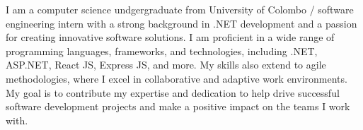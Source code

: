 

\begin{cvparagraph}

    I am a computer science undgergraduate from University of Colombo /  software engineering intern with a strong background in .NET development and a passion for creating innovative software solutions. I am proficient in a wide range of programming languages, frameworks, and technologies, including .NET, ASP.NET, React JS, Express JS, and more. My skills also extend to agile methodologies, where I excel in collaborative and adaptive work environments. My goal is to contribute my expertise and dedication to help drive successful software development projects and make a positive impact on the teams I work with.
\end{cvparagraph}
